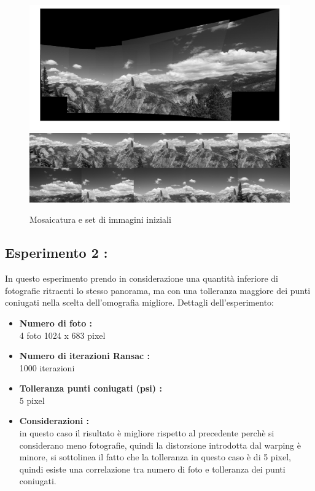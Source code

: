 \documentclass[11pt, oneside]{article}   	%
\begin{document}
\begin{figure}[H]
\includegraphics[width=\textwidth]{montagna_14_foto.jpg}
\includegraphics[width=\textwidth]{foto_mosaico_montagna.png}

\caption{Mosaicatura e set di immagini iniziali}
\end{figure}


\subsection{Esperimento 2 :}
In questo esperimento prendo in considerazione una quantità inferiore di fotografie ritraenti lo stesso panorama, ma con una tolleranza maggiore dei punti coniugati nella scelta dell'omografia migliore.
Dettagli dell'esperimento:
\begin{itemize}
	\item \textbf{Numero di foto :} \\
	4 foto 1024 x 683 pixel
	\item \textbf{Numero di iterazioni Ransac : } \\
	1000 iterazioni
	\item \textbf{Tolleranza punti coniugati (psi) :}\\
        5 pixel
        \item \textbf{Considerazioni : }\\
        in questo caso il risultato è migliore rispetto al precedente perchè si considerano meno fotografie, quindi la distorsione introdotta dal warping è minore, si sottolinea il fatto che la tolleranza in questo caso è di 5 pixel, quindi esiste una correlazione tra numero di foto e tolleranza dei punti coniugati.
        
\end{itemize}
\end{document}
